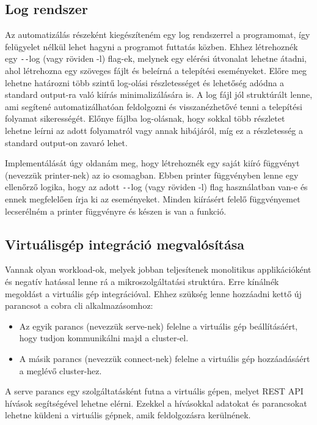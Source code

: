 \subsection{Log rendszer}
Az automatizálás részeként kiegészíteném egy log rendszerrel a programomat, így felügyelet nélkül lehet hagyni a programot futtatás közben.
Ehhez létrehoznék egy \texttt{-{}-}log (vagy röviden -l) flag-ek, melynek egy elérési útvonalat lehetne átadni, ahol létrehozna egy szöveges fájlt és beleírná a telepítési eseményeket. Előre meg lehetne határozni több szintű log-olási részletességet és lehetőség adódna a standard output-ra való kiírás minimalizálására is.
A log fájl jól struktúrált lenne, ami segítené automatizálhatóan feldolgozni és visszanézhetővé tenni a telepítési folyamat sikerességét.
Előnye fájlba log-olásnak, hogy sokkal több részletet lehetne leírni az adott folyamatról vagy annak hibájáról, míg ez a részletesség a standard output-on zavaró lehet.

Implementálását úgy oldanám meg, hogy létrehoznék egy saját kiíró függvényt (nevezzük printer-nek) az io csomagban.
Ebben printer függvényben lenne egy ellenőrző logika, hogy az adott \texttt{-{}-}log (vagy röviden -l) flag használatban van-e és ennek megfelelően írja ki az eseményeket. Minden kiírásért felelő függvényemet lecserélném a printer függvényre és készen is van a funkció. 

\subsection{Virtuálisgép integráció megvalósítása}
Vannak olyan workload-ok, melyek jobban teljesítenek monolitikus applikációként és negatív hatással lenne rá a mikroszolgáltatási struktúra.
Erre kínálnék megoldást a virtuális gép integrációval.
Ehhez szükség lenne hozzáadni kettő új parancsot a cobra cli alkalmazásomhoz:
\begin{itemize}
  \item Az egyik parancs (nevezzük serve-nek) felelne a virtuális gép beállításáért, hogy tudjon kommunikálni majd a cluster-el.
  \item A másik parancs (nevezzük connect-nek) felelne a virtuális gép hozzáadásáért a meglévő cluster-hez.
\end{itemize}

A serve parancs egy szolgáltatásként futna a virtuális gépen, melyet REST API hívások segítségével lehetne elérni.
Ezekkel a hívásokkal adatokat és parancsokat lehetne küldeni a virtuális gépnek, amik feldolgozásra kerülnének.

